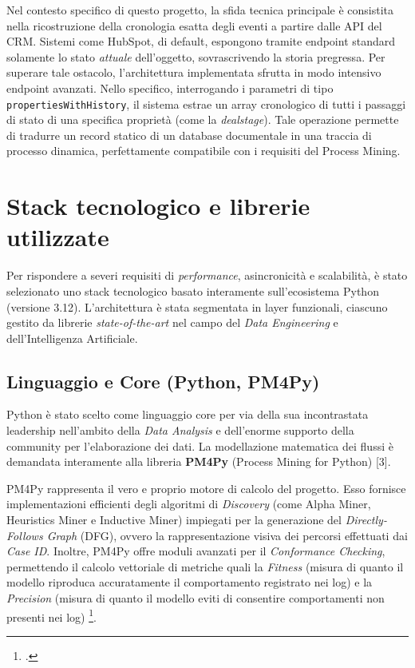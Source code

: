 \documentclass[12pt, a4paper]{report}
\begin{document}
Nel contesto specifico di questo progetto, la sfida tecnica principale è consistita nella ricostruzione della cronologia esatta degli eventi a partire dalle API del CRM. Sistemi come HubSpot, di default, espongono tramite endpoint standard solamente lo stato \textit{attuale} dell'oggetto, sovrascrivendo la storia pregressa. Per superare tale ostacolo, l'architettura implementata sfrutta in modo intensivo endpoint avanzati. Nello specifico, interrogando i parametri di tipo \texttt{propertiesWithHistory}, il sistema estrae un array cronologico di tutti i passaggi di stato di una specifica proprietà (come la \textit{dealstage}). Tale operazione permette di tradurre un record statico di un database documentale in una traccia di processo dinamica, perfettamente compatibile con i requisiti del Process Mining.

\section{Stack tecnologico e librerie utilizzate}
Per rispondere a severi requisiti di \textit{performance}, asincronicità e scalabilità, è stato selezionato uno stack tecnologico basato interamente sull'ecosistema Python (versione 3.12). L'architettura è stata segmentata in layer funzionali, ciascuno gestito da librerie \textit{state-of-the-art} nel campo del \textit{Data Engineering} e dell'Intelligenza Artificiale.

\subsection{Linguaggio e Core (Python, PM4Py)}
Python è stato scelto come linguaggio core per via della sua incontrastata leadership nell'ambito della \textit{Data Analysis} e dell'enorme supporto della community per l'elaborazione dei dati. La modellazione matematica dei flussi è demandata interamente alla libreria \textbf{PM4Py} (Process Mining for Python) [3]. 

PM4Py rappresenta il vero e proprio motore di calcolo del progetto. Esso fornisce implementazioni efficienti degli algoritmi di \textit{Discovery} (come Alpha Miner, Heuristics Miner e Inductive Miner) impiegati per la generazione del \textit{Directly-Follows Graph} (DFG), ovvero la rappresentazione visiva dei percorsi effettuati dai \textit{Case ID}. Inoltre, PM4Py offre moduli avanzati per il \textit{Conformance Checking}, permettendo il calcolo vettoriale di metriche quali la \textit{Fitness} (misura di quanto il modello riproduca accuratamente il comportamento registrato nei log) e la \textit{Precision} (misura di quanto il modello eviti di consentire comportamenti non presenti nei log) \footcite{pm4py}.
\end{document}
